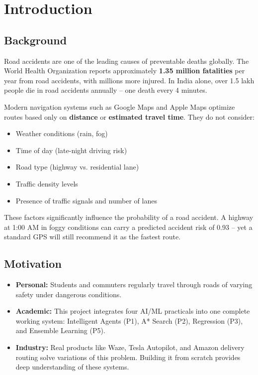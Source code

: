 \documentclass[12pt,a4paper]{report}
\begin{document}
\chapter{Introduction}

\section{Background}
Road accidents are one of the leading causes of preventable deaths globally. The World Health Organization reports approximately \textbf{1.35 million fatalities} per year from road accidents, with millions more injured. In India alone, over 1.5 lakh people die in road accidents annually -- one death every 4 minutes.

Modern navigation systems such as Google Maps and Apple Maps optimize routes based only on \textbf{distance} or \textbf{estimated travel time}. They do not consider:
\begin{itemize}
  \item Weather conditions (rain, fog)
  \item Time of day (late-night driving risk)
  \item Road type (highway vs. residential lane)
  \item Traffic density levels
  \item Presence of traffic signals and number of lanes
\end{itemize}

These factors significantly influence the probability of a road accident. A highway at 1:00 AM in foggy conditions can carry a predicted accident risk of 0.93 -- yet a standard GPS will still recommend it as the fastest route.

\section{Motivation}
\begin{itemize}
  \item \textbf{Personal:} Students and commuters regularly travel through roads of varying safety under dangerous conditions.
  \item \textbf{Academic:} This project integrates four AI/ML practicals into one complete working system: Intelligent Agents (P1), A* Search (P2), Regression (P3), and Ensemble Learning (P5).
  \item \textbf{Industry:} Real products like Waze, Tesla Autopilot, and Amazon delivery routing solve variations of this problem. Building it from scratch provides deep understanding of these systems.
\end{itemize}
\end{document}
